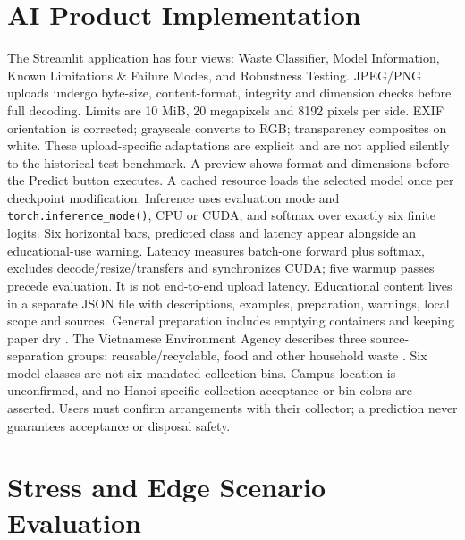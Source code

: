 \documentclass[conference]{IEEEtran}
\begin{document}
\section{AI Product Implementation}
The Streamlit application has four views: Waste Classifier, Model Information, Known Limitations \& Failure Modes, and Robustness Testing. JPEG/PNG uploads undergo byte-size, content-format, integrity and dimension checks before full decoding. Limits are 10 MiB, 20 megapixels and 8192 pixels per side. EXIF orientation is corrected; grayscale converts to RGB; transparency composites on white. These upload-specific adaptations are explicit and are not applied silently to the historical test benchmark. A preview shows format and dimensions before the Predict button executes.
A cached resource loads the selected model once per checkpoint modification. Inference uses evaluation mode and \texttt{torch.inference\_mode()}, CPU or CUDA, and softmax over exactly six finite logits. Six horizontal bars, predicted class and latency appear alongside an educational-use warning. Latency measures batch-one forward plus softmax, excludes decode/resize/transfers and synchronizes CUDA; five warmup passes precede evaluation. It is not end-to-end upload latency.
Educational content lives in a separate JSON file with descriptions, examples, preparation, warnings, local scope and sources. General preparation includes emptying containers and keeping paper dry \cite{epa,ecology}. The Vietnamese Environment Agency describes three source-separation groups: reusable/recyclable, food and other household waste \cite{vietnam}. Six model classes are not six mandated collection bins. Campus location is unconfirmed, and no Hanoi-specific collection acceptance or bin colors are asserted. Users must confirm arrangements with their collector; a prediction never guarantees acceptance or disposal safety.

\section{Stress and Edge Scenario Evaluation}
\end{document}
